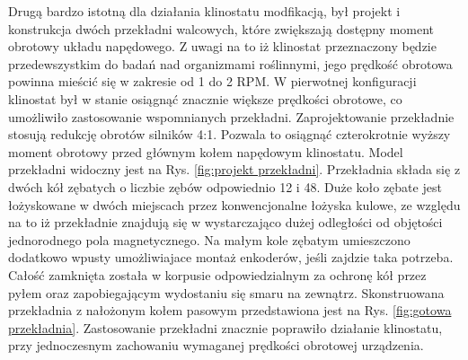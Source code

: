 Drugą bardzo istotną dla działania klinostatu modfikacją, był projekt i konstrukcja dwóch
 przekładni walcowych, które zwiększają dostępny moment obrotowy układu napędowego. Z uwagi na
  to iż klinostat przeznaczony będzie przedewszystkim do badań nad organizmami roślinnymi, jego
   prędkość obrotowa powinna mieścić się w zakresie od 1 do 2 RPM. W pierwotnej konfiguracji
    klinostat był w stanie osiągnąć znacznie większe prędkości obrotowe, co umożliwiło
     zastosowanie wspomnianych przekładni. Zaprojektowanie przekładnie stosują redukcję obrotów
      silników 4:1. Pozwala to osiągnąć czterokrotnie wyższy moment obrotowy przed głównym kołem
       napędowym klinostatu. Model przekładni widoczny jest na Rys. \ref{fig:projekt
       	 przekładni}. Przekładnia składa się z dwóch kół zębatych o liczbie zębów odpowiednio 12 i 48. Duże koło zębate jest
          łożyskowane w dwóch miejscach przez konwencjonalne łożyska kulowe, ze względu na to iż przekładnie znajdują się w wystarczająco dużej odległości od objętości jednorodnego
            pola magnetycznego. Na małym kole zębatym umieszczono dodatkowo wpusty umożliwiajace
             montaż enkoderów, jeśli zajdzie taka potrzeba. Całość zamknięta została w korpusie
              odpowiedzialnym za ochronę kół przez pyłem oraz zapobiegającym wydostaniu się
               smaru na zewnątrz. Skonstruowana przekładnia z nałożonym kołem pasowym
                przedstawiona jest na Rys. \ref{fig:gotowa przekładnia}. Zastosowanie przekładni
                 znacznie poprawiło działanie klinostatu, przy jednoczesnym zachowaniu wymaganej
                  prędkości obrotowej urządzenia.       


